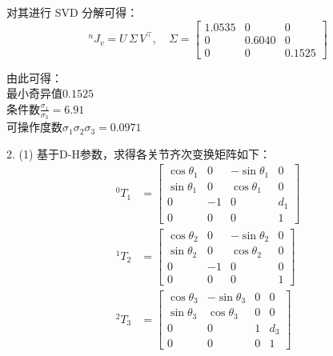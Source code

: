 \documentclass[UTF8, 13pt]{ctexart}
\begin{document}
对其进行 SVD 分解可得：
\[
{}^n J_v = U\, \Sigma\, V^{\top},\quad
\Sigma = \begin{bmatrix}
            1.0535 & 0 & 0 \\
            0 & 0.6040 & 0 \\
            0 & 0 & 0.1525
        \end{bmatrix}
\]

由此可得： \\
最小奇异值\(0.1525\) \\
条件数\(\frac{\sigma_1}{\sigma_3} = 6.91\) \\
可操作度数\(\sigma_1 \sigma_2 \sigma_3 = 0.0971\)
\newpage



2.
(1)
基于D-H参数，求得各关节齐次变换矩阵如下：
\[
\begin{aligned}
    {}^0 T_1 &= \begin{bmatrix}
                    \cos\theta_1 & 0 & -\sin\theta_1 & 0 \\
                    \sin\theta_1 & 0 & \cos\theta_1 & 0 \\
                    0 & -1 & 0 & d_1 \\
                    0 & 0 & 0 & 1
                \end{bmatrix} \\
    {}^1 T_2 &= \begin{bmatrix}
                    \cos\theta_2 & 0 & -\sin\theta_2 & 0 \\
                    \sin\theta_2 & 0 & \cos\theta_2 & 0 \\
                    0 & -1 & 0 & 0 \\
                    0 & 0 & 0 & 1
                \end{bmatrix} \\
    {}^2 T_3 &= \begin{bmatrix}
                    \cos\theta_3 & -\sin\theta_3 & 0 & 0 \\
                    \sin\theta_3 & \cos\theta_3 & 0 & 0 \\
                    0 & 0 & 1 & d_3 \\
                    0 & 0 & 0 & 1
                \end{bmatrix} \\
\end{aligned}
\]
\end{document}

